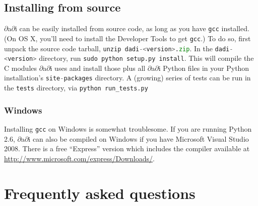 \documentclass[12pt]{article}
\makeatletter
\newcommand{\dadi}{$\partial$a$\partial$i\xspace}
\newcommand{\py}[1]{\lstinline[language=Python, showstringspaces=False]@#1@}
\makeatother
\begin{document}
\subsection{Installing from source}

\dadi can be easily installed from source code, as long as you have \py{gcc} installed. (On OS X, you'll need to install the Developer Tools to get \py{gcc}.) To do so, first unpack the source code tarball, \py{unzip dadi-<version>.zip}.
In the \py{dadi-<version>} directory, run \py{sudo python setup.py install}.
This will compile the C modules \dadi uses and install those plus all \dadi Python files in your Python installation's \py{site-packages} directory.
A (growing) series of tests can be run in the \py{tests} directory, via \py{python run_tests.py}

\subsubsection{Windows}

Installing \py{gcc} on Windows is somewhat troublesome. If you are running Python 2.6, \dadi can also be compiled on Windows if you have Microsoft Visual Studio 2008. There is a free ``Express'' version which includes the compiler available at \url{http://www.microsoft.com/express/Downloads/}.

\section{Frequently asked questions}
\end{document}
